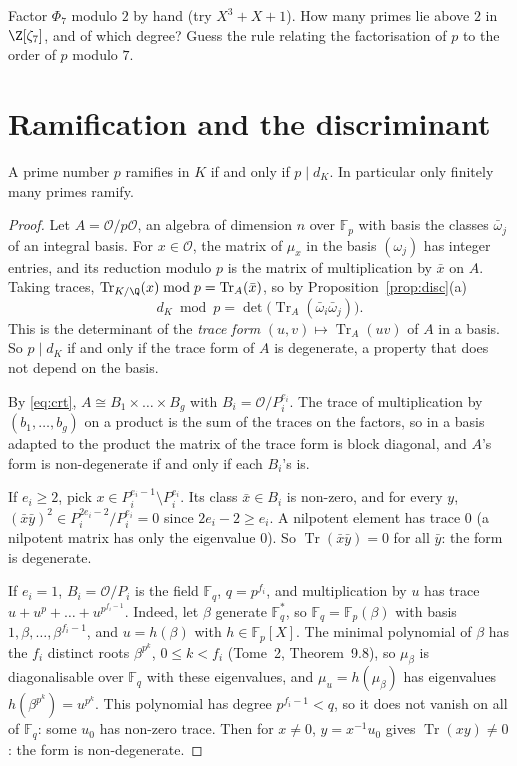 \begin{think}
Factor $\Phi_7$ modulo $2$ by hand (try $X^3+X+1$). How many primes lie above $2$ in $\Z[\zeta_7]$, and of which degree?
Guess the rule relating the factorisation of $p$ to the order of $p$ modulo $7$.
\end{think}

\section{Ramification and the discriminant}

\begin{theorem}\label{thm:ramdisc}
A prime number $p$ ramifies in $K$ if and only if $p\mid d_K$. In particular only finitely many primes ramify.
\end{theorem}
\begin{proof}
Let $A=\mathcal O/p\mathcal O$, an algebra of dimension $n$ over $\mathbb F_p$ with basis the classes $\bar\omega_j$ of an
integral basis. For $x\in\mathcal O$, the matrix of $\mu_x$ in the basis $(\omega_j)$ has integer entries, and its
reduction modulo $p$ is the matrix of multiplication by $\bar x$ on $A$. Taking traces, $\operatorname{Tr}_{K/\Q}(x)\bmod
p=\operatorname{Tr}_A(\bar x)$, so by Proposition~\ref{prop:disc}(a)
\[
d_K\bmod p=\det\bigl(\operatorname{Tr}_A(\bar\omega_i\bar\omega_j)\bigr).
\]
This is the determinant of the \emph{trace form} $(u,v)\mapsto\operatorname{Tr}_A(uv)$ of $A$ in a basis. So $p\mid
d_K$ if and only if the trace form of $A$ is degenerate, a property that does not depend on the basis.

By \eqref{eq:crt}, $A\cong B_1\times\dots\times B_g$ with $B_i=\mathcal O/P_i^{e_i}$. The trace of multiplication by
$(b_1,\dots,b_g)$ on a product is the sum of the traces on the factors, so in a basis adapted to the product the matrix
of the trace form is block diagonal, and $A$'s form is non-degenerate if and only if each $B_i$'s is.

If $e_i\ge2$, pick $x\in P_i^{e_i-1}\setminus P_i^{e_i}$. Its class $\bar x\in B_i$ is non-zero, and for every $y$,
$(\bar x\bar y)^{2}\in P_i^{2e_i-2}/P_i^{e_i}=0$ since $2e_i-2\ge e_i$. A nilpotent element has trace $0$ (a nilpotent
matrix has only the eigenvalue $0$). So $\operatorname{Tr}(\bar x\bar y)=0$ for all $\bar y$: the form is degenerate.

If $e_i=1$, $B_i=\mathcal O/P_i$ is the field $\mathbb F_{q}$, $q=p^{f_i}$, and multiplication by $u$ has trace
$u+u^p+\dots+u^{p^{f_i-1}}$. Indeed, let $\beta$ generate $\mathbb F_q^*$, so $\mathbb F_q=\mathbb F_p(\beta)$ with basis
$1,\beta,\dots,\beta^{f_i-1}$, and $u=h(\beta)$ with $h\in\mathbb F_p[X]$. The minimal polynomial of $\beta$ has the $f_i$
distinct roots $\beta^{p^k}$, $0\le k<f_i$ (Tome~2, Theorem~9.8), so $\mu_\beta$ is diagonalisable over $\mathbb F_q$ with
these eigenvalues, and $\mu_u=h(\mu_\beta)$ has eigenvalues $h(\beta^{p^k})=u^{p^k}$. This polynomial has degree $p^{f_i-1}<q$, so it does not vanish on all of
$\mathbb F_q$: some $u_0$ has non-zero trace. Then for $x\ne0$, $y=x^{-1}u_0$ gives $\operatorname{Tr}(xy)\ne0$: the form is
non-degenerate.


\end{proof}
